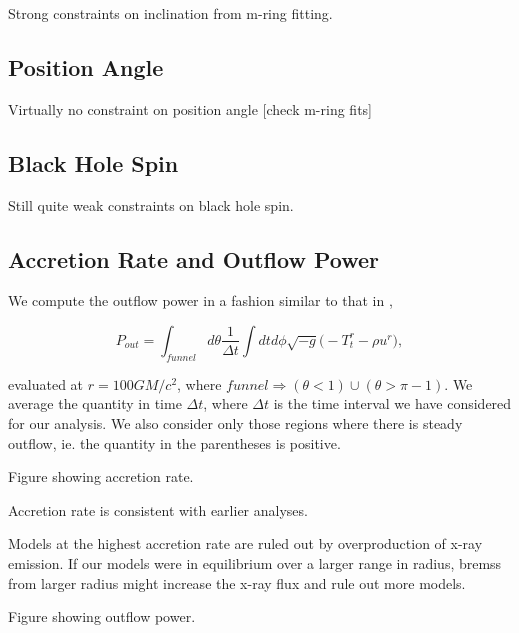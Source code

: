 
Strong constraints on inclination from m-ring fitting.

\subsection{Position Angle}

Virtually no constraint on position angle [check m-ring fits]

\subsection{Black Hole Spin}

Still quite weak constraints on black hole spin.

\subsection{Accretion Rate and Outflow Power}


We compute the outflow power in a fashion similar to that in \citet{M87PaperV},

\begin{equation}
    P_{out} = \int_{funnel}d\theta\frac{1}{\Delta t}\int dtd\phi\sqrt{-g}\big(-T^{r}_{t}-\rho u^{r}\big),
\end{equation}

evaluated at $r=100GM/c^{2}$, where $funnel\Rightarrow(\theta<1)\cup(\theta>\pi-1)$. We average the quantity in time $\Delta t$, where $\Delta t$ is the time interval we have considered for our analysis. We also consider only those regions where there is steady outflow, ie. the quantity in the parentheses is positive.

Figure showing accretion rate.

Accretion rate is consistent with earlier analyses.

Models at the highest accretion rate are ruled out by overproduction of x-ray emission.  If our models were in equilibrium over a larger range in radius, bremss from larger radius might increase the x-ray flux and rule out more models.

Figure showing outflow power.

